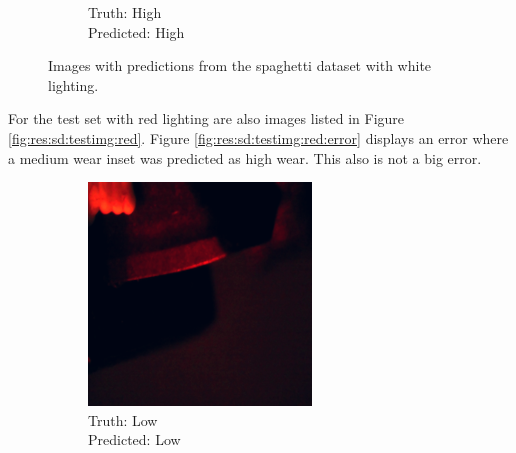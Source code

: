 \begin{figure}[hbtp]
\begin{subfigure}{.24\textwidth}
			\caption{Truth: High \\Predicted: High}
		\end{subfigure}
		\caption{Images with predictions from the spaghetti dataset with white lighting.}
		\label{fig:res:sd:testimg}
	\end{figure}

	For the test set with red lighting are also images listed in Figure \ref{fig:res:sd:testimg:red}. Figure \ref{fig:res:sd:testimg:red:error} displays an error where a medium wear inset was predicted as high wear. This also is not a big error. 
	\begin{figure}[hbtp]
		\begin{subfigure}{.24\textwidth}
			\centering
			\includegraphics[width=\linewidth]{fig/results/wandb/spaghetti_dataset/images/media_images_Examples_r_194_p1_t1.png}
			\caption{Truth: Low \\Predicted: Low}
		\end{subfigure}
		\hspace*{\fill}
		\begin{subfigure}{.24\textwidth}
			\centering

\end{subfigure}
\end{figure}
